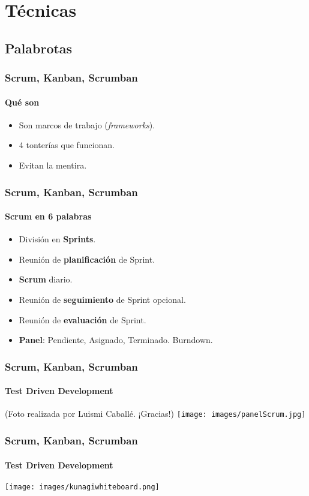  \section{Técnicas}

  \subsection{Palabrotas}

  \begin{frame}
   \frametitle{Scrum, Kanban, Scrumban}
   \framesubtitle{Qué son}

   \begin{itemize}
    \item Son marcos de trabajo (\textit{frameworks}).
    \item 4 tonterías que funcionan.
    \item Evitan la mentira.
   \end{itemize}
  \end{frame}

  \begin{frame}
   \frametitle{Scrum, Kanban, Scrumban}
   \framesubtitle{Scrum en 6 palabras}

   \begin{itemize}
    \item División en \textbf{Sprints}.
    \item Reunión de \textbf{planificación} de Sprint.
    \item \textbf{Scrum} diario.
    \item Reunión de \textbf{seguimiento} de Sprint opcional.
    \item Reunión de \textbf{evaluación} de Sprint.
    \item \textbf{Panel}: Pendiente, Asignado, Terminado. Burndown.
   \end{itemize}
  \end{frame}

  \begin{frame}
   \frametitle{Scrum, Kanban, Scrumban}
   \framesubtitle{Test Driven Development}

   \begin{center}
    {\small (Foto realizada por Luismi Caballé. ¡Gracias!)}
    \texttt{[image: images/panelScrum.jpg]}
   \end{center}
  \end{frame}

  \begin{frame}
   \frametitle{Scrum, Kanban, Scrumban}
   \framesubtitle{Test Driven Development}

   \begin{center}
    \texttt{[image: images/kunagiwhiteboard.png]}
   \end{center}

  \end{frame}


